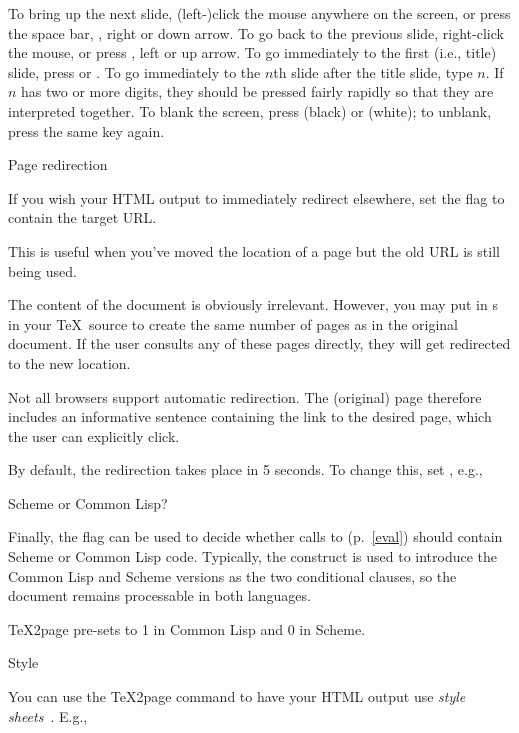 To bring up the next slide, (left-)click the mouse
anywhere  on the screen, or press the space bar, , right or down
arrow.  To go back to the previous slide, right-click the
mouse, or press , left or up arrow.
To go immediately to the first (i.e., title) slide, press  or .  To go
immediately to the $n$th slide after the title slide, type $n$.  If $n$ has
two or more digits, they should be pressed fairly rapidly so that they are
interpreted together.  To blank the screen, press 
(black) or  (white); to unblank, press the same key again.

\beginsection Page redirection

If you wish your HTML output to immediately redirect elsewhere,
set the flag \p{\TZPredirect} to contain the target URL.

This is useful when
you've moved the location of a page but the old URL is still being used.

The content of the document is obviously irrelevant.  However, you may
put in \p{\eject}s in your \TeX\ source to create the same number of pages as
in the original document.  If the user consults any of these pages
directly, they will get redirected to the new location.

Not all browsers support automatic redirection. The (original)
page therefore includes an informative sentence containing the
link to the desired page, which the user can explicitly click.

By default, the redirection takes place in 5 seconds. To change
this, set \p{\TZPredirectseconds}, e.g.,


\beginsection Scheme or Common Lisp?

Finally, the flag \p{\TZPcommonlisp} can be used to decide whether calls to
\p{\eval} (p.~\ref{eval}) should contain Scheme or Common Lisp code.
Typically, the construct  is used to introduce
the Common Lisp and Scheme versions as the two conditional clauses, so
the document remains processable in both languages.

\TeX2page pre-sets \p{\TZPcommonlisp} to 1 in Common Lisp and 0 in Scheme.

 Style

%
You can use the \TeX2page command  to have your HTML output use {\em style
sheets}~\cite{w3c:css,lb:css,htmlhelp:css}.  E.g.,


